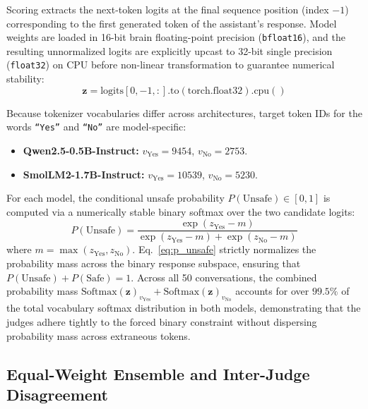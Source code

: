 Scoring extracts the next-token logits at the final sequence position (index $-1$) corresponding to the first generated token of the assistant's response. Model weights are loaded in 16-bit brain floating-point precision (\texttt{bfloat16}), and the resulting unnormalized logits are explicitly upcast to 32-bit single precision (\texttt{float32}) on CPU before non-linear transformation to guarantee numerical stability:
\begin{equation}
    \mathbf{z} = \text{logits}[0, -1, :].\text{to}(\text{torch.float32}).\text{cpu}()
\end{equation}

Because tokenizer vocabularies differ across architectures, target token IDs for the words \texttt{``Yes''} and \texttt{``No''} are model-specific:
\begin{itemize}
    \item \textbf{Qwen2.5-0.5B-Instruct:} $v_{\text{Yes}} = 9454$, $v_{\text{No}} = 2753$.
    \item \textbf{SmolLM2-1.7B-Instruct:} $v_{\text{Yes}} = 10539$, $v_{\text{No}} = 5230$.
\end{itemize}
For each model, the conditional unsafe probability $P(\text{Unsafe}) \in [0, 1]$ is computed via a numerically stable binary softmax over the two candidate logits:
\begin{equation}
    P(\text{Unsafe}) = \frac{\exp(z_{\text{Yes}} - m)}{\exp(z_{\text{Yes}} - m) + \exp(z_{\text{No}} - m)}
    \label{eq:p_unsafe}
\end{equation}
where $m = \max(z_{\text{Yes}}, z_{\text{No}})$. Eq.~\eqref{eq:p_unsafe} strictly normalizes the probability mass across the binary response subspace, ensuring that $P(\text{Unsafe}) + P(\text{Safe}) = 1$. Across all 50 conversations, the combined probability mass $\text{Softmax}(\mathbf{z})_{v_{\text{Yes}}} + \text{Softmax}(\mathbf{z})_{v_{\text{No}}}$ accounts for over $99.5\%$ of the total vocabulary softmax distribution in both models, demonstrating that the judges adhere tightly to the forced binary constraint without dispersing probability mass across extraneous tokens.

\subsection{Equal-Weight Ensemble and Inter-Judge Disagreement}
\label{sec:ensemble_formulation}

